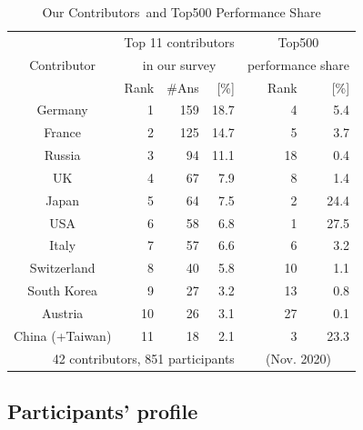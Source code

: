 \documentclass[preprint,5p,times]{elsarticle}
\def\Country{Contributor\xspace{}}%
\def\countries{contributors\xspace{}}%
\def\Countries{Contributors\xspace{}}%
\begin{document}
\begin{table}%
  \small\color{blue}%
\begin{center}%
\caption{Our \Countries\ and Top500 Performance Share}\label{tab:countries}%
\begin{tabular}{c||r|r|r||r|r}%
  \hline%
  &
  \multicolumn{3}{c||}{Top 11 \countries} &
  \multicolumn{2}{c}{Top500} \\
  \Country &
  \multicolumn{3}{c||}{in our survey} &
  \multicolumn{2}{c}{\footnotesize performance share} \\
  \cline{2-6}%
  & Rank & \#Ans & [\%] & Rank & [\%] \\
  \hline%
  \hline%
  Germany         & 1 & 159 & 18.7 & 4  & 5.4  \\%
  France          & 2 & 125 & 14.7 & 5  & 3.7  \\%
  Russia          & 3 & 94  & 11.1 & 18 & 0.4  \\%
  UK              & 4 & 67  &  7.9 & 8  & 1.4  \\%
  Japan           & 5 & 64  &  7.5 & 2  & 24.4 \\%
  USA             & 6 & 58  &  6.8 & 1  & 27.5 \\%
  Italy           & 7 & 57  &  6.6 & 6  & 3.2  \\%
  \cline{1-4}%
  Switzerland     & 8  & 40 &  5.8 & 10 & 1.1  \\%
  South Korea     & 9  & 27 &  3.2 & 13 & 0.8  \\%
  Austria         & 10 & 26 &  3.1 & 27 & 0.1  \\%
  China (+Taiwan) & 11 & 18 &  2.1 & 3  & 23.3 \\%
  \hline%
  \multicolumn{4}{r}{\footnotesize 42 \countries, 851 participants} &
  \multicolumn{2}{c}{\footnotesize (Nov. 2020)} \\%
\end{tabular}%
\vspace{-3mm}%
\end{center}%
\end{table}%

\subsection*{Participants' profile}
\end{document}
